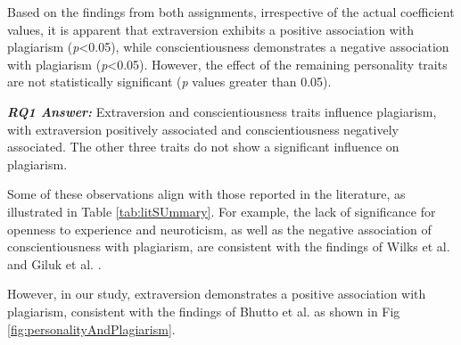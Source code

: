 Based on the findings from both assignments, irrespective of the actual coefficient values, it is apparent that extraversion exhibits a positive association with plagiarism (\textit{p}<0.05), while conscientiousness demonstrates a negative association with plagiarism (\textit{p}<0.05). However, the effect of the remaining personality traits are not statistically significant (\textit{p} values greater than 0.05).

\vspace{8pt}
\begin{mdframed}
\textbf{\textit{RQ1 Answer:}} Extraversion and conscientiousness traits influence plagiarism, with extraversion positively associated and conscientiousness negatively associated. The other three traits do not show a significant influence on plagiarism. 
\end{mdframed}
\vspace{8pt}

Some of these observations align with those reported in the literature, as illustrated in Table \ref{tab:litSUmmary}. For example, the lack of significance for openness to experience and neuroticism, as well as the negative association of conscientiousness with plagiarism, are consistent with the findings of Wilks et al. \cite{Wilks2016-WILPTA-3} and Giluk et al. \cite{Giluk2015BigFP}. 

However, in our study, extraversion demonstrates a positive association with plagiarism, consistent with the findings of Bhutto et al. \cite{Bhutto2019ACS} as shown in Fig \ref{fig:personalityAndPlagiarism}. 

